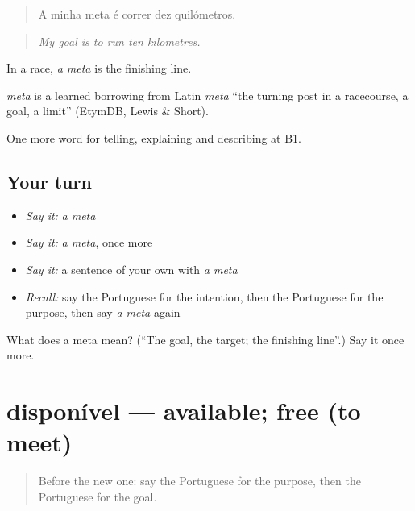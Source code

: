 \begin{quote}
A minha meta é correr dez quilómetros.
\end{quote}

\begin{quote}
\emph{My goal is to run ten kilometres.}
\end{quote}

In a race, \emph{a meta} is the finishing line.

\begin{cousinweb}
\emph{meta} is a learned borrowing from Latin \emph{mēta} \textquotedblleft{}the turning post in a racecourse, a goal, a limit\textquotedblright{} (EtymDB, Lewis \& Short).
\end{cousinweb}

\begin{grammarlens}[title={What you've built}]
One more word for telling, explaining and describing at B1.
\end{grammarlens}

\subsection*{Your turn}
\begin{itemize}
\raggedright
  \item \emph{Say it:} \emph{a meta}
  \item \emph{Say it:} \emph{a meta}, once more
  \item \emph{Say it:} a sentence of your own with \emph{a meta}
  \item \emph{Recall:} say the Portuguese for the intention, then the Portuguese for the purpose, then say \emph{a meta} again
\end{itemize}

\begin{tcolorbox}[breakable,colback=teal!4,colframe=teal!35!black,title={Before you move on}]
What does a meta mean? (\textquotedblleft{}The goal, the target; the finishing line\textquotedblright{}.) Say it once more.
\end{tcolorbox}
\section[disponível]{disponível — available; free (to meet)}

\label{lesson:PT-C374-disponivel}



\begin{quote}
Before the new one: say the Portuguese for the purpose, then the Portuguese for the goal.
\end{quote}

